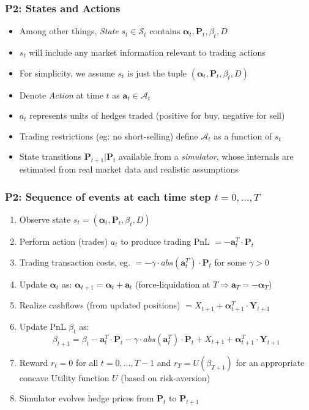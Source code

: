 \documentclass[handout]{beamer}
\begin{document}
\begin{frame}
\frametitle{P2: States and Actions}
\pause
\begin{itemize}[<+->]
\item Among other things, {\em State} $s_t \in \mathcal{S}_t$ contains $\bm{\alpha}_t, \bm{P}_t, \beta_t, D$
\item $s_t$ will include any market information relevant to trading actions
\item For simplicity, we assume $s_t$ is just the tuple $(\bm{\alpha}_t, \bm{P}_t, \beta_t, D)$
\item Denote {\em Action} at time $t$ as $\bm{a}_t \in \mathcal{A}_t$
\item $a_t$ represents units of hedges traded (positive for buy, negative for sell)
\item Trading restrictions (eg: no short-selling) define $\mathcal{A}_t$ as a function of $s_t$
\item State transitions $\bm{P}_{t+1}|\bm{P}_t$ available from a {\em simulator}, whose internals are estimated from real market data and realistic assumptions
\end{itemize}
\end{frame}

\begin{frame}
\frametitle{P2: Sequence of events at each time step $t=0, \ldots, T$}
\pause
\begin{enumerate}[<+->]
\item Observe state $s_t = (\bm{\alpha}_t, \bm{P}_t, \beta_t, D)$
\item Perform action (trades) $a_t$ to produce trading PnL $= - \bm{a}_t^T \cdot \bm{P}_t$
\item Trading transaction costs, eg. $= - \gamma \cdot abs(\bm{a}_t^T) \cdot \bm{P}_t$ for some $\gamma > 0$
\item Update $\bm{\alpha}_t$ as: $\bm{\alpha}_{t+1} = \bm{\alpha}_t + \bm{a}_t$ (force-liquidation at $T \Rightarrow \bm{a}_T= -\bm{\alpha}_T$)
\item Realize cashflows (from updated positions) $=X_{t+1} + \bm{\alpha}_{t+1}^T \cdot \bm{Y}_{t+1}$
\item Update PnL $\beta_t$ as:
$$\beta_{t+1} = \beta_t - \bm{a}_t^T \cdot \bm{P}_t - \gamma \cdot abs(\bm{a}_t^T) \cdot \bm{P}_t + X_{t+1} + \bm{\alpha}_{t+1}^T \cdot \bm{Y}_{t+1}$$
\item Reward $r_t = 0$ for all $t = 0, \ldots, T-1$ and $r_T = U(\beta_{T+1})$ for an appropriate concave Utility function $U$ (based on risk-aversion)
\item Simulator evolves hedge prices from $\bm{P}_t$ to $\bm{P}_{t+1}$
\end{enumerate}
\end{frame}
\end{document}
